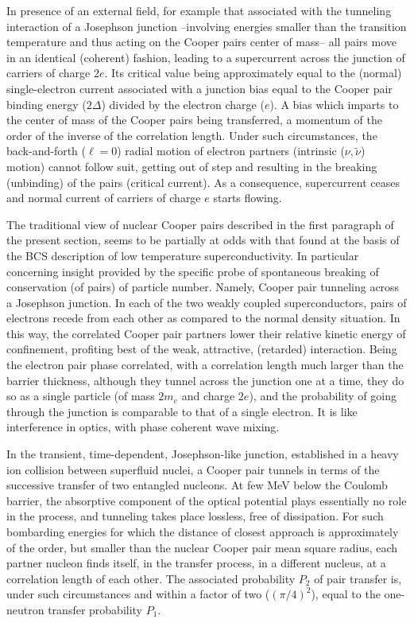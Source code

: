 In presence of an external field, for example that associated with the tunneling interaction of a Josephson junction --involving energies smaller than the transition temperature and thus acting on the Cooper pairs center of mass-- all pairs move  in an identical (coherent) fashion, leading to a supercurrent across the junction of carriers of charge $2e$. Its critical value  being approximately equal to the (normal) single-electron current associated with a junction bias equal to the Cooper pair binding energy ($2\Delta$) 
 divided by the electron charge ($e$). A bias which imparts 
 to the center of mass of the  Cooper pairs being transferred, a momentum of the order of the inverse of the correlation length. Under such circumstances,  the back-and-forth ($\ell=0$) radial motion of electron partners (intrinsic ($\nu,\tilde \nu$) motion) cannot follow suit, getting out of step and resulting in the breaking (unbinding) of the pairs (critical current). As a consequence, supercurrent ceases and  normal current of carriers of charge $e$ starts flowing.

The traditional view of nuclear Cooper pairs described in the first paragraph of the present section, seems to be partially at odds with that found at the basis of the BCS description of low temperature superconductivity. In particular concerning insight provided by the specific probe of spontaneous breaking of conservation (of pairs) of particle number. Namely, Cooper pair tunneling across a Josephson junction.  In each of the two weakly coupled superconductors, pairs of electrons recede from each other  as compared to the normal density situation. In this way, the correlated Cooper pair partners  lower their relative kinetic energy of confinement, profiting best of the weak, attractive, (retarded) interaction. Being the electron pair phase correlated, with a correlation length much larger than the barrier thickness, although they tunnel across the junction one at a time, they do so as a single particle (of mass $2m_e$ and charge $2e$), and the probability of going through the junction is comparable to that of a single electron. It is like interference in optics, with phase coherent wave mixing.



In the transient, time-dependent, Josephson-like junction, established in a heavy ion collision between superfluid nuclei, a Cooper pair tunnels in terms of the successive transfer of two entangled nucleons. At few MeV below the Coulomb barrier, the absorptive component of the optical potential plays essentially no role in the process, and tunneling takes place lossless, free of dissipation. For such bombarding energies for which the distance of closest approach is approximately of the order, but smaller than the nuclear Cooper pair mean square radius, each partner nucleon  finds itself, in the transfer process, in a different nucleus, at a correlation length of each other. The associated probability $P_2$ of pair transfer is, under such circumstances and within a factor of two ($(\pi/4)^2$), equal to the one-neutron transfer probability $P_1$.


